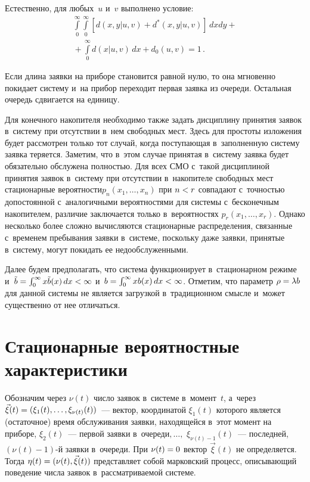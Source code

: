 \begin{multicols}{2}
Естественно, для любых~$u$ и~$v$ выполнено условие:
\begin{multline*}
\int\limits_0^\infty \int\limits_0^\infty
\left[d(x,y|u,v) + d^*(x,y|u,v)\right]\,dxdy+{}\\
{}+ \int\limits_0^\infty d(x|u,v) \,dx
+ d_0(u,v) =1\,.
\end{multline*}

Если длина заявки на приборе становится
равной нулю, то она мгновенно покидает систему и~на прибор переходит первая
заявка из очереди. Остальная очередь сдвигается на единицу.


Для конечного накопителя необходимо также задать
дисциплину принятия заявок в~систему при отсутствии в~нем свободных мест.
Здесь для простоты изложения будет рассмотрен только
тот случай, когда поступающая в~заполненную систему заявка теряется.
Заметим, что в~этом случае принятая в~систему заявка
будет обязательно обслужена полностью.
Для всех СМО с~такой дисциплиной принятия заявок в~систему
при отсутствии в~накопителе свободных мест стационарные
вероятности\linebreak $p_n(x_1,\ldots,x_n)$ при $n\hm<r$ совпадают
с~точностью до\linebreak постоянной с~аналогичными вероятностями
для системы с~бесконечным накопителем, различие заключается
только в~вероятностях $p_{r}(x_1,\ldots,x_{r})$.
Однако несколько более сложно вычисляются стационарные
распределения, связанные с~временем пребывания заявки 
в~системе, поскольку даже заявки, принятые в~систему, могут покидать
ее недообслуженными.

Далее будем предполагать, что система
функционирует в~стационарном режиме
и~$\tb \hm= \int_0^\infty x\tb(x)\,dx \hm< \infty$
и~$b \hm= \int_0^\infty x b(x)\,dx \hm< \infty$.
Отметим, что параметр $\rho \hm= \lambda b$ для данной системы не
является загрузкой в~традиционном смысле и~может существенно от нее отличаться.


\section{Стационарные вероятностные характеристики}

Обозначим через $\nu(t)$ число заявок в~системе
в~момент~$t$, а~через $\vec\xi(t)\hm =(\xi_{1}(t),\ldots,\xi_{\nu(t)}(t))$~---
вектор, координатой $\xi_{1}(t)$ которого
является (остаточное) время обслуживания
заявки, находящейся в~этот момент на приборе,
$\xi_{2}(t)$~--- первой заявки в~очереди$,\ldots,$ $\xi_{\nu(t)-1}(t)$~---
последней, \mbox{$(\nu(t)-1)$-й} заявки в~очереди.
При $\nu(t)\hm=0$ вектор $\vec\xi(t)$ не определяется.
Тогда $\eta(t)\hm=(\nu(t),\vec\xi(t))$ представляет
собой марковский процесс, описывающий поведение числа заявок в~рассматриваемой системе.


\end{multicols}
